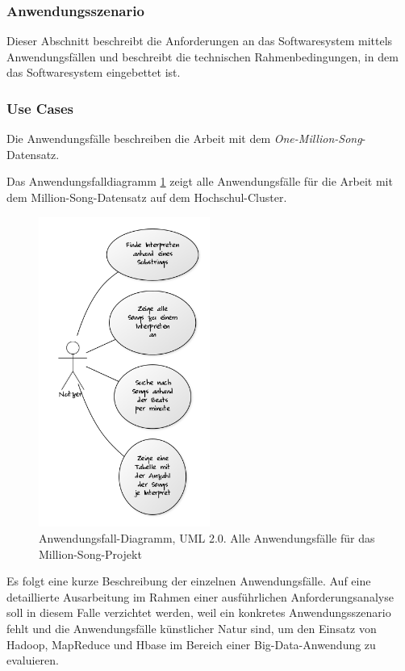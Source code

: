 \subsubsection{Anwendungsszenario}
Dieser Abschnitt beschreibt die Anforderungen an das Softwaresystem mittels Anwendungsfällen und 
beschreibt die technischen Rahmenbedingungen, in dem das Softwaresystem eingebettet ist.
\subsubsection{Use Cases}

Die Anwendungsfälle beschreiben die Arbeit mit dem \textit{One-Million-Song}-Datensatz. 

Das Anwendungsfalldiagramm \ref{anforderungen:usecasediagramm} zeigt alle Anwendungsfälle für
die Arbeit mit dem Million-Song-Datensatz auf dem Hochschul-Cluster.

\begin{figure}[H]
	\centering
	\includegraphics[width=0.5\textwidth]{images/06usecases.png}
	\caption{Anwendungsfall-Diagramm, UML 2.0. Alle Anwendungsfälle für das Million-Song-Projekt}
	\label{anforderungen:usecasediagramm}
\end{figure}

Es folgt eine kurze Beschreibung der einzelnen Anwendungsfälle. Auf eine detaillierte Ausarbeitung im Rahmen einer 
ausführlichen Anforderungsanalyse soll in diesem Falle verzichtet werden, weil ein konkretes Anwendungsszenario fehlt und
die Anwendungsfälle künstlicher Natur sind, um den Einsatz von Hadoop, MapReduce und Hbase im Bereich einer
Big-Data-Anwendung zu evaluieren.

